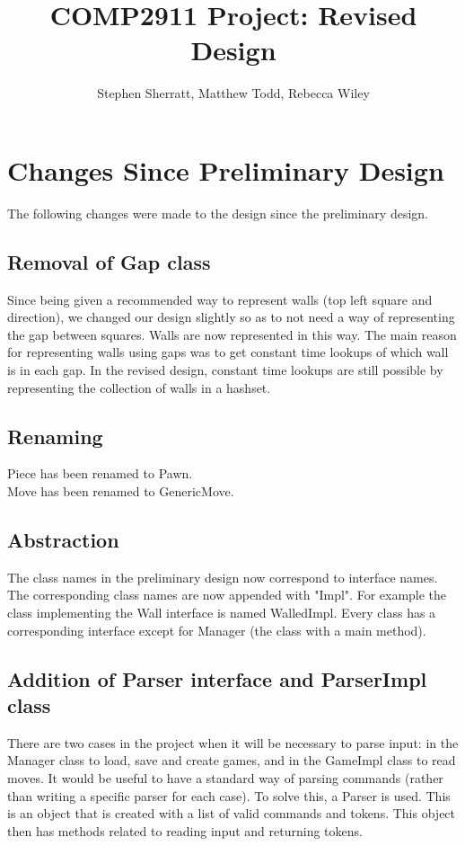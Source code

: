 \documentclass[a4paper]{article}
\title{COMP2911 Project: Revised Design}
\author{Stephen Sherratt, Matthew Todd, Rebecca Wiley}
\begin{document}
\maketitle


\section{Changes Since Preliminary Design}

The following changes were made to the design since the preliminary design.


\subsection{Removal of Gap class}

Since being given a recommended way to represent walls (top left square and direction), 
    we changed our design slightly so as to not need a way of representing the gap between squares.
Walls are now represented in this way.
The main reason for representing walls using gaps was to get constant time lookups of which wall is in each gap.
In the revised design, constant time lookups are still possible by representing the collection of walls in a hashset.

\subsection{Renaming}

Piece has been renamed to Pawn. \\
Move has been renamed to GenericMove.

\subsection{Abstraction}

The class names in the preliminary design now correspond to interface names.
The corresponding class names are now appended with "Impl".
For example the class implementing the Wall interface is named WalledImpl.
Every class has a corresponding interface except for Manager (the class with a main method).

\subsection{Addition of Parser interface and ParserImpl class}

There are two cases in the project when it will be necessary to parse input: in the Manager class to load, 
    save and create games, and in the GameImpl class to read moves.
It would be useful to have a standard way of parsing commands (rather than writing a specific parser for each case).
To solve this, a Parser is used.
This is an object that is created with a list of valid commands and tokens.
This object then has methods related to reading input and returning tokens.
\end{document}
